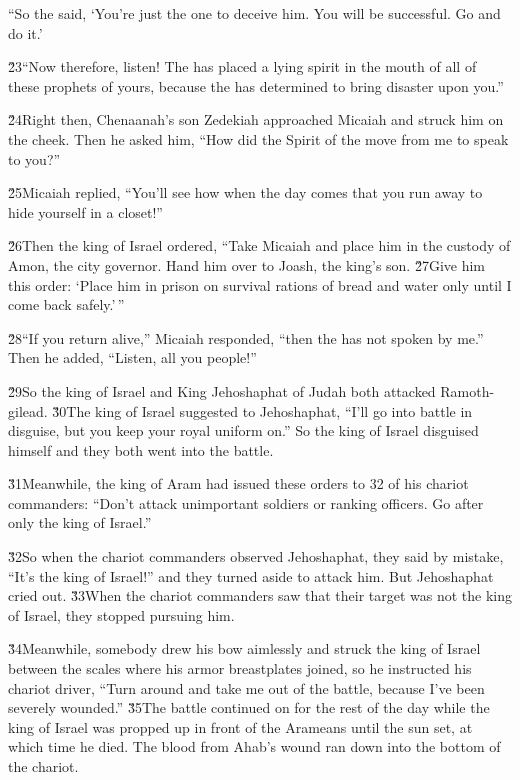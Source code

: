 ``So the  said, `You're just the one to deceive him. You will be successful. Go and do it.'

\v{23}``Now therefore, listen! The  has placed a lying spirit in the mouth of all of these prophets of yours, because the  has determined to bring disaster upon you.''

\v{24}Right then, Chenaanah's son Zedekiah approached Micaiah and struck him on the cheek. Then he asked him, ``How did the Spirit of the  move from me to speak to you?''

\v{25}Micaiah replied, ``You'll see how when the day comes that you run away to hide yourself in a closet!''

\v{26}Then the king of Israel ordered, ``Take Micaiah and place him in the custody of Amon, the city governor. Hand him over to Joash, the king's son. \v{27}Give him this order: `Place him in prison on survival rations of bread and water only until I come back safely.'\,''

\v{28}``If you return alive,'' Micaiah responded, ``then the  has not spoken by me.'' Then he added, ``Listen, all you people!''

\v{29}So the king of Israel and King Jehoshaphat of Judah both attacked Ramoth-gilead. \v{30}The king of Israel suggested to Jehoshaphat, ``I'll go into battle in disguise, but you keep your royal uniform on.'' So the king of Israel disguised himself and they both went into the battle.

\v{31}Meanwhile, the king of Aram had issued these orders to 32 of his chariot commanders: ``Don't attack unimportant soldiers or ranking officers. Go after only the king of Israel.''

\v{32}So when the chariot commanders observed Jehoshaphat, they said by mistake, ``It's the king of Israel!'' and they turned aside to attack him. But Jehoshaphat cried out. \v{33}When the chariot commanders saw that their target was not the king of Israel, they stopped pursuing him.

\v{34}Meanwhile, somebody drew his bow aimlessly and struck the king of Israel between the scales where his armor breastplates joined, so he instructed his chariot driver, ``Turn around and take me out of the battle, because I've been severely wounded.'' \v{35}The battle continued on for the rest of the day while the king of Israel was propped up in front of the Arameans until the sun set, at which time he died. The blood from Ahab's wound ran down into the bottom of the chariot.

